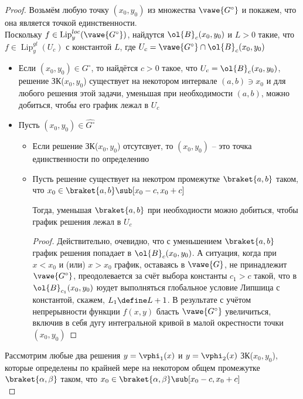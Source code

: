 \begin{proof}
    Возьмём любую точку $ (x_0, y_0) $ из множества $ \vawe{G^\circ} $ и покажем, что она является точкой единственности. \\
    Поскольку $ f \in \operatorname{Lip}_y^{loc}(\vawe{G^\circ}) $, найдутся $ \ol{B}_c(x_0, y_0) $ и $ L > 0 $ такие, что $ f \in \operatorname{Lip}_y^{gl}(U_c) $ с константой $ L $, где $ U_c = \vawe{G^\circ} \cap \ol{B}_c(x_0, y_0) $
    \begin{itemize}
        \item Если $ (x_0, y_0) \in G^\circ $, то найдётся $ c > 0 $ такое, что $ U_c = \ol{B}_c(x_0, y_0) $, решение ЗК($ x_0, y_0 $) существует на некотором интервале $ (a, b) \ni x_0 $ и для любого решения этой задачи, уменьшая при необходимости $ (a, b) $, можно добиться, чтобы его график лежал в $ U_c $
        \item Пусть $ (x_0, y_0) \in \hat{G^\circ} $
        \begin{itemize}
            \item Если решение ЗК($ x_0, y_0 $) отсутсвует, то $ (x_0, y_0) $ -- это точка единственности по определению
            \item Пусть решение существует на некотром промежутке $ \braket{a, b} $ таком, что $ x_0 \in \braket{a, b} \sub [x_0 - c, x_0 + c] $
            \begin{statement}
                Тогда, уменьшая $ \braket{a, b} $ при необходиости можно добиться, чтобы график решения лежал в $ U_c $
            \end{statement}
            \begin{proof}
                Действительно, очевидно, что с уменьшением $ \braket{a, b} $ график решения попадает в $ \ol{B}_c(x_0, y_0) $. А ситуация, когда при $ x < x_0 $ и (или) $ x > x_0 $ график, оставаясь в $ \vawe{G} $, не принадлежит $ \vawe{G^\circ} $, преодолевается за счёт выбора константы $ c_1 > c $ такой, что в $ \ol{B}_{c_1}(x_0, y_0) $ юудет выполняться глобальное условие Липшица с константой, скажем, $ L_1 \define L + 1 $. В результате с учётом непрерывности функции $ f(x, y) $ бласть $ \vawe{G^\circ} $ увеличиться, включив в себя дугу интегральной кривой в малой окрестности точки $ (x_0, y_0) $
            \end{proof}
        \end{itemize}
    \end{itemize}
    Рассмотрим любые два решения $ y = \vphi_1(x) $ и $ y = \vphi_2(x) $ ЗК($ x_0, y_0 $), которые определены по крайней мере на некотором общем промежутке $ \braket{\alpha, \beta} $ таком, что $ x_0 \in \braket{\alpha, \beta} \sub [x_0 - c, x_0 + c] $ \\

\end{proof}
